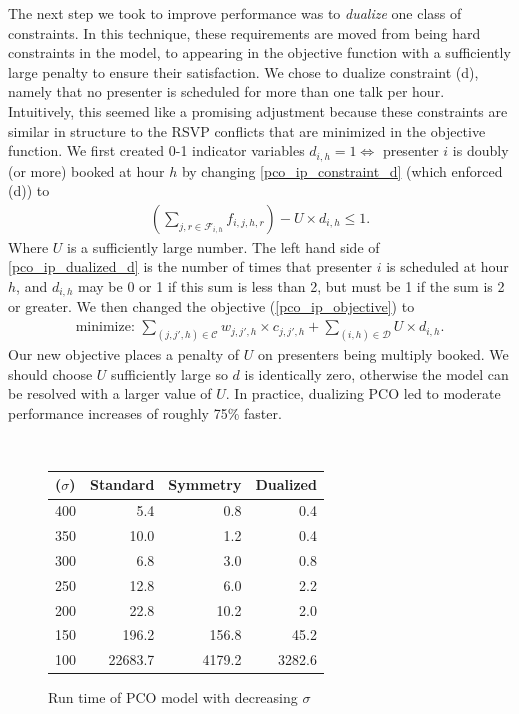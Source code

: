 \documentclass{svjour3}                     %
\begin{document}
The next step we took to improve performance was to \emph{dualize} one class of constraints.
In this technique, these requirements are moved from being hard constraints in the model, to appearing in the objective function with a sufficiently large penalty to ensure their satisfaction.
We chose to dualize constraint (d), namely that no presenter is scheduled for more than one talk per hour. 
Intuitively, this seemed like a promising adjustment because these constraints are similar in structure to the RSVP conflicts that are minimized in the objective function.
We first created 0-1 indicator variables $d_{i,h} = 1 \iff $ presenter $i$ is doubly (or more) booked at hour $h$ by changing \ref{pco_ip_constraint_d} (which enforced (d)) to
\begin{gather}
	\left( \sum_{j,r \in \mathcal F_{i,h}} f_{i,j,h,r} \right) - U \times d_{i,h} \le 1. \label{pco_ip_dualized_d}
\end{gather}
Where $U$ is a sufficiently large number.
The left hand side of \ref{pco_ip_dualized_d} is the number of times that presenter $i$ is scheduled at hour $h$, and $d_{i,h}$ may be 0 or 1 if this sum is less than 2, but must be 1 if the sum is 2 or greater. 
We then changed the objective (\ref{pco_ip_objective}) to 
\begin{gather}
	\text{minimize: } \sum_{(j,j',h) \in \mathcal C} w_{j,j',h} \times c_{j,j',h} + \sum_{(i,h) \in \mathcal D} U \times d_{i,h}.
\end{gather}
Our new objective places a penalty of $U$ on presenters being multiply booked.
We should choose $U$ sufficiently large so $d$ is identically zero, otherwise the model can be resolved with a larger value of $U$. 
In practice, dualizing PCO led to moderate performance increases of roughly 75\% faster.

\begin{figure}[h!]	
	\caption{Run time of PCO model with decreasing $\sigma$}
	\centering
	 \\
	\begin{tabular}{| l | r | r | r |}
		\hline
		 ($\sigma$) & Standard & Symmetry & Dualized \\ \hline
		 400 & 5.4 & 0.8 & 0.4 \\
		 350 & 10.0 & 1.2 & 0.4 \\
		 300 & 6.8 & 3.0 & 0.8\\
		 250 &12.8 &6.0 &2.2 \\
		 200 & 22.8 & 10.2 &2.0\\
		 150 & 196.2 & 156.8 & 45.2 \\
		 100 & 22683.7 & 4179.2 &3282.6 \\
		\hline
	\end{tabular}	
	\label{2013_normal_sigma_run_time}
\end{figure}
\end{document}
